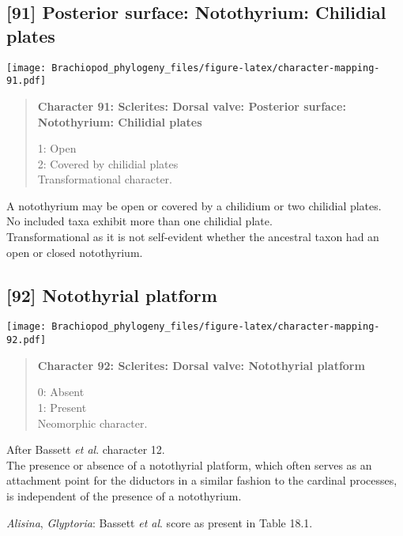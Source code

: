 \documentclass[openany]{book}
\theoremstyle{definition}
\theoremstyle{definition}
\theoremstyle{definition}
\theoremstyle{remark}
\begin{document}
\subsection*{{[}91{]} Posterior surface: Notothyrium: Chilidial
plates}\label{posterior-surface-notothyrium-chilidial-plates}

\texttt{[image: Brachiopod\_phylogeny\_files/figure-latex/character-mapping-91.pdf]}

\begin{quote}
\textbf{Character 91: Sclerites: Dorsal valve: Posterior surface:
Notothyrium: Chilidial plates}

1: Open\\
2: Covered by chilidial plates\\
Transformational character.
\end{quote}

A notothyrium may be open or covered by a chilidium or two chilidial
plates.\\
No included taxa exhibit more than one chilidial plate.\\
Transformational as it is not self-evident whether the ancestral taxon
had an open or closed notothyrium.

\subsection*{{[}92{]} Notothyrial platform}\label{notothyrial-platform}

\texttt{[image: Brachiopod\_phylogeny\_files/figure-latex/character-mapping-92.pdf]}

\begin{quote}
\textbf{Character 92: Sclerites: Dorsal valve: Notothyrial platform}

0: Absent\\
1: Present\\
Neomorphic character.
\end{quote}

After Bassett \emph{et al}.
\citeyearpar{Bassett2001Functionalmorphology} character 12.\\
The presence or absence of a notothyrial platform, which often serves as
an attachment point for the diductors in a similar fashion to the
cardinal processes, is independent of the presence of a notothyrium.

\hypertarget{Alisina-coding-92}{}
\emph{Alisina}, \emph{Glyptoria}: Bassett \emph{et al}.
\citeyearpar{Bassett2001Functionalmorphology} score as present in Table
18.1.
\end{document}
